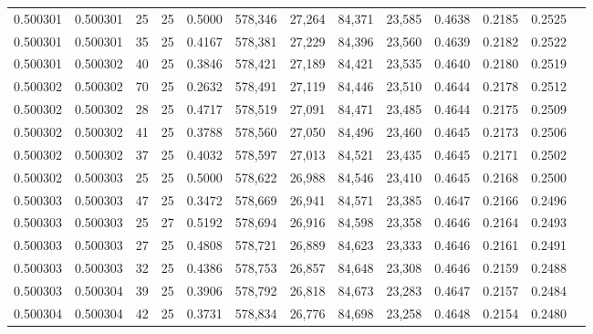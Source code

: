 \begin{tabular}{rrrrrrrrrrrrr}
0.500301 & 0.500301 &    25 &  25 &                                     0.5000 & 578,346 &  27,264 &  84,371 &  23,585 & 0.4638 & 0.2185 & 0.2525 \\
0.500301 & 0.500301 &    35 &  25 &                                     0.4167 & 578,381 &  27,229 &  84,396 &  23,560 & 0.4639 & 0.2182 & 0.2522 \\
0.500301 & 0.500302 &    40 &  25 &                                     0.3846 & 578,421 &  27,189 &  84,421 &  23,535 & 0.4640 & 0.2180 & 0.2519 \\
0.500302 & 0.500302 &    70 &  25 &                                     0.2632 & 578,491 &  27,119 &  84,446 &  23,510 & 0.4644 & 0.2178 & 0.2512 \\
0.500302 & 0.500302 &    28 &  25 &                                     0.4717 & 578,519 &  27,091 &  84,471 &  23,485 & 0.4644 & 0.2175 & 0.2509 \\
0.500302 & 0.500302 &    41 &  25 &                                     0.3788 & 578,560 &  27,050 &  84,496 &  23,460 & 0.4645 & 0.2173 & 0.2506 \\
0.500302 & 0.500302 &    37 &  25 &                                     0.4032 & 578,597 &  27,013 &  84,521 &  23,435 & 0.4645 & 0.2171 & 0.2502 \\
0.500302 & 0.500303 &    25 &  25 &                                     0.5000 & 578,622 &  26,988 &  84,546 &  23,410 & 0.4645 & 0.2168 & 0.2500 \\
0.500303 & 0.500303 &    47 &  25 &                                     0.3472 & 578,669 &  26,941 &  84,571 &  23,385 & 0.4647 & 0.2166 & 0.2496 \\
0.500303 & 0.500303 &    25 &  27 &                                     0.5192 & 578,694 &  26,916 &  84,598 &  23,358 & 0.4646 & 0.2164 & 0.2493 \\
0.500303 & 0.500303 &    27 &  25 &                                     0.4808 & 578,721 &  26,889 &  84,623 &  23,333 & 0.4646 & 0.2161 & 0.2491 \\
0.500303 & 0.500303 &    32 &  25 &                                     0.4386 & 578,753 &  26,857 &  84,648 &  23,308 & 0.4646 & 0.2159 & 0.2488 \\
0.500303 & 0.500304 &    39 &  25 &                                     0.3906 & 578,792 &  26,818 &  84,673 &  23,283 & 0.4647 & 0.2157 & 0.2484 \\
0.500304 & 0.500304 &    42 &  25 &                                     0.3731 & 578,834 &  26,776 &  84,698 &  23,258 & 0.4648 & 0.2154 & 0.2480 \\

\end{tabular}
